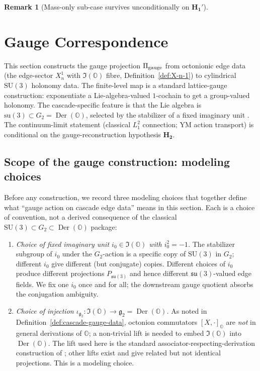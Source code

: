 \documentclass[11pt, a4paper]{amsart}
\theoremstyle{definition}
\newtheorem{remark}[theorem]{Remark}
\newcommand{\OO}{\mathbb{O}}
\newcommand{\gge}{{\rm gauge}}
\newcommand{\Der}{\operatorname{Der}}
\begin{document}
\begin{remark}[Mass-only sub-case survives unconditionally on $\mathbf{H_1'}$]
\section{Gauge Correspondence}
\label{sec:gauge}

This section constructs the gauge projection $\Pi_{\gge}$ from
octonionic edge data (the edge-sector $X_n^1$ with $\Im(\OO)$
fibre, Definition~\ref{def:X-n-1}) to cylindrical $\mathrm{SU}(3)$
holonomy data. The finite-level map is a standard lattice-gauge
construction: exponentiate a Lie-algebra-valued $1$-cochain to get
a group-valued holonomy. The cascade-specific feature is that the
Lie algebra is $\mathrm{su}(3) \subset G_2 = \Der(\OO)$, selected
by the stabilizer of a fixed imaginary unit
\cite[\S 6]{CascadeEmbeddings}. The continuum-limit statement
(classical $L^2_1$ connection; YM action transport) is conditional
on the gauge-reconstruction hypothesis $\mathbf{H_2}$.

\subsection{Scope of the gauge construction: modeling choices}
\label{subsec:gauge-modeling}

Before any construction, we record three modeling choices that
together define what ``gauge action on cascade edge data'' means
in this section. Each is a choice of convention, not a derived
consequence of the classical $\mathrm{SU}(3) \subset G_2 \subset
\Der(\OO)$ package:

\begin{enumerate}
\item[\textup{(M1)}] \emph{Choice of fixed imaginary unit $i_0 \in
  \Im(\OO)$ with $i_0^2 = -1$.} The stabilizer subgroup of $i_0$
  under the $G_2$-action is a specific copy of $\mathrm{SU}(3)$ in
  $G_2$; different $i_0$ give different (but conjugate) copies.
  Different choices of $i_0$ produce different projections
  $P_{\mathfrak{su}(3)}$ and hence different
  $\mathfrak{su}(3)$-valued edge fields. We fix one $i_0$ once
  and for all; the downstream gauge quotient absorbs the
  conjugation ambiguity.

\item[\textup{(M2)}] \emph{Choice of injection
  $\iota_{\mathfrak{g}_2} \colon \Im(\OO) \to \mathfrak{g}_2 =
  \Der(\OO)$.} As noted in Definition~\ref{def:cascade-gauge-data},
  octonion commutators $[X, \cdot]_{\OO}$ are \emph{not} in
  general derivations of $\OO$; a non-trivial lift is needed to
  embed $\Im(\OO)$ into $\Der(\OO)$. The lift used here is the
  standard associator-respecting-derivation construction of
  \cite[\S 2]{BaezOctonions}; other lifts exist and give related
  but not identical projections. This is a modeling choice.


\end{enumerate}
\end{remark}
\end{document}
